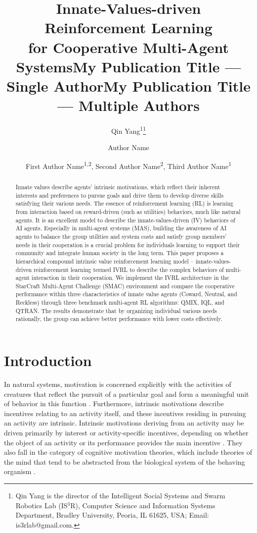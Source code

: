 \documentclass[letterpaper]{article} %
\title{Innate-Values-driven Reinforcement Learning \\ for Cooperative Multi-Agent Systems}
\author{
    Qin Yang\textsuperscript{\rm 1}\thanks{Qin Yang is the director of the Intelligent Social Systems and Swarm Robotics Lab (IS$^3$R), Computer Science and Information Systems Department, Bradley University, Peoria, IL 61625, USA; Email: is3rlab@gmail.com.}
}
\title{My Publication Title --- Single Author}
\author {
    Author Name
}
\title{My Publication Title --- Multiple Authors}
\author {
    First Author Name\textsuperscript{\rm 1,\rm 2},
    Second Author Name\textsuperscript{\rm 2},
    Third Author Name\textsuperscript{\rm 1}
}
\begin{document}
\maketitle

\begin{abstract}
Innate values describe agents' intrinsic motivations, which reflect their inherent interests and preferences to pursue goals and drive them to develop diverse skills satisfying their various needs. The essence of reinforcement learning (RL) is learning from interaction based on reward-driven (such as utilities) behaviors, much like natural agents. It is an excellent model to describe the innate-values-driven (IV) behaviors of AI agents. Especially in multi-agent systems (MAS), building the awareness of AI agents to balance the group utilities and system costs and satisfy group members' needs in their cooperation is a crucial problem for individuals learning to support their community and integrate human society in the long term. This paper proposes a hierarchical compound intrinsic value reinforcement learning model -- innate-values-driven reinforcement learning termed IVRL to describe the complex behaviors of multi-agent interaction in their cooperation. We implement the IVRL architecture in the StarCraft Multi-Agent Challenge (SMAC) environment and compare the cooperative performance within three characteristics of innate value agents (Coward, Neutral, and Reckless) through three benchmark multi-agent RL algorithms: QMIX, IQL, and QTRAN. The results demonstrate that by organizing individual various needs rationally, the group can achieve better performance with lower costs effectively.

\end{abstract}

\section{Introduction}

In natural systems, motivation is concerned explicitly with the activities of creatures that reflect the pursuit of a particular goal and form a meaningful unit of behavior in this function \cite{heckhausen2018motivation}. Furthermore, intrinsic motivations describe incentives relating to an activity itself, and these incentives residing in pursuing an activity are intrinsic. Intrinsic motivations deriving from an activity may be driven primarily by interest or activity-specific incentives, depending on whether the object of an activity or its performance provides the main incentive \cite{schiefele1996motivation}. They also fall in the category of cognitive motivation theories, which include theories of the mind that tend to be abstracted from the biological system of the behaving organism \cite{merrick2013novelty}.
\end{document}
